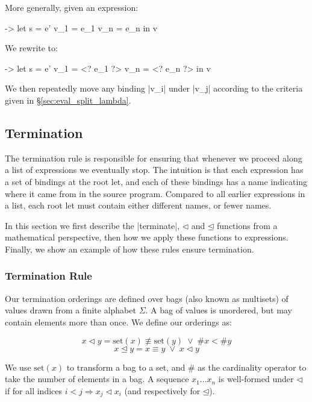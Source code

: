 \documentclass[draft]{sigplanconf}
\newcommand{\set}{\mathrm{set}}
\newcommand{\veeskip}{\;\vee\;}
\begin{document}
More generally, given an expression:

\begin{code}
\free ->  let  s    = e'
               v_1  = e_1
               v_n  = e_n
          in   v
\end{code}

\noindent We rewrite to:

\begin{code}
\free ->  let  s    = e'
               v_1  = <? e_1 ?>
               v_n  = <? e_n ?>
          in   v
\end{code}

We then repeatedly move any binding |v_i| under |v_j| according to the criteria given in \S\ref{sec:eval_split_lambda}.

\subsection{Termination}
\label{sec:term}

The termination rule is responsible for ensuring that whenever we proceed along a list of expressions we eventually stop. The intuition is that each expression has a set of bindings at the root let, and each of these bindings has a name indicating where it came from in the source program. Compared to all earlier expressions in a list, each root let must contain either different names, or fewer names.

In this section we first describe the |terminate|, $\lhd$ and $\unlhd$ functions from a mathematical perspective, then how we apply these functions to expressions. Finally, we show an example of how these rules ensure termination.

\subsubsection{Termination Rule}
\label{sec:term_rule}

Our termination orderings are defined over bags (also known as multisets) of values drawn from a finite alphabet $\Sigma$. A bag of values is unordered, but may contain elements more than once. We define our orderings as:

\vspace{-\bigskipamount}

\[
x \lhd y = \set(x) \not\equiv \set(y)  \veeskip \# x < \# y
\]
\[
x \unlhd y = x \equiv y \veeskip x \lhd y
\]

We use $\set(x)$ to transform a bag to a set, and $\#$ as the cardinality operator to take the number of elements in a bag. A sequence $x_1 \ldots x_n$ is well-formed under $\lhd$ if for all indices $i < j \Rightarrow x_j \lhd x_i$ (and respectively for $\unlhd$).
\end{document}
